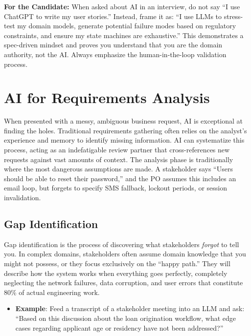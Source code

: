 \documentclass[
  11pt,
  openany,
  oneside]{book}
\providecommand{\tightlist}{%
  \setlength{\itemsep}{0pt}\setlength{\parskip}{0pt}}
\renewenvironment{quote}{\begin{customquote}}{\end{customquote}}
\begin{document}
\begin{quote}
\textbf{For the Candidate:} When asked about AI in an interview, do not
say ``I use ChatGPT to write my user stories.'' Instead, frame it as:
``I use LLMs to stress-test my domain models, generate potential failure
modes based on regulatory constraints, and ensure my state machines are
exhaustive.'' This demonstrates a spec-driven mindset and proves you
understand that you are the domain authority, not the AI. Always
emphasize the human-in-the-loop validation process.
\end{quote}

\section{AI for Requirements
Analysis}\label{ai-for-requirements-analysis}

When presented with a messy, ambiguous business request, AI is
exceptional at finding the holes. Traditional requirements gathering
often relies on the analyst's experience and memory to identify missing
information. AI can systematize this process, acting as an indefatigable
review partner that cross-references new requests against vast amounts
of context. The analysis phase is traditionally where the most dangerous
assumptions are made. A stakeholder says ``Users should be able to reset
their password,'' and the PO assumes this includes an email loop, but
forgets to specify SMS fallback, lockout periods, or session
invalidation.

\subsection{Gap Identification}\label{gap-identification}

Gap identification is the process of discovering what stakeholders
\emph{forgot} to tell you. In complex domains, stakeholders often assume
domain knowledge that you might not possess, or they focus exclusively
on the ``happy path.'' They will describe how the system works when
everything goes perfectly, completely neglecting the network failures,
data corruption, and user errors that constitute 80\% of actual
engineering work.

\begin{itemize}
\tightlist
\item
  \textbf{Example}: Feed a transcript of a stakeholder meeting into an
  LLM and ask: ``Based on this discussion about the loan origination
  workflow, what edge cases regarding applicant age or residency have
  not been addressed?''
\end{itemize}
\end{document}
